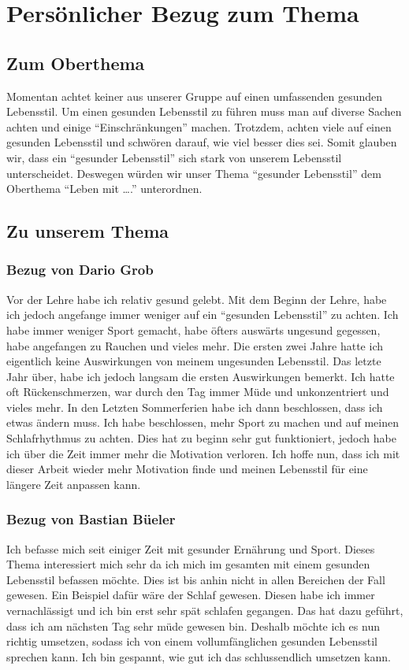 \chapter{Persönlicher Bezug zum Thema}
\section{Zum Oberthema}
Momentan achtet keiner aus unserer Gruppe auf einen umfassenden gesunden Lebensstil.
Um einen gesunden Lebensstil zu führen muss man auf diverse Sachen achten und einige “Einschränkungen” machen. Trotzdem, achten viele auf einen gesunden Lebensstil und schwören darauf, wie viel besser dies sei. 
Somit glauben wir, dass ein “gesunder Lebensstil” sich stark von unserem Lebensstil unterscheidet. Deswegen würden wir unser Thema “gesunder Lebensstil” dem Oberthema “Leben mit ….” unterordnen.
\section{Zu unserem Thema}
\subsection{Bezug von Dario Grob}
Vor der Lehre habe ich relativ gesund gelebt. Mit dem Beginn der Lehre, habe ich jedoch angefange immer weniger auf ein “gesunden Lebensstil” zu achten.
\newline
Ich habe immer weniger Sport gemacht, habe öfters auswärts ungesund gegessen, habe angefangen zu Rauchen und vieles mehr. 
\newline
Die ersten zwei Jahre hatte ich eigentlich keine Auswirkungen von meinem ungesunden Lebensstil. 
\newline
Das letzte Jahr über, habe ich jedoch langsam die ersten Auswirkungen bemerkt. Ich hatte oft Rückenschmerzen, war durch den Tag immer Müde und unkonzentriert und vieles mehr.
\newline
In den Letzten Sommerferien habe ich dann beschlossen, dass ich etwas ändern muss. Ich habe beschlossen, mehr Sport zu machen und auf meinen Schlafrhythmus zu achten. 
\newline
Dies hat zu beginn sehr gut funktioniert, jedoch habe ich über die Zeit immer mehr die Motivation verloren.
\newline
Ich hoffe nun, dass ich mit dieser Arbeit wieder mehr Motivation finde und meinen Lebensstil für eine längere Zeit anpassen kann.
\subsection{Bezug von Bastian Büeler}
Ich befasse mich seit einiger Zeit mit gesunder Ernährung und Sport. Dieses Thema interessiert mich sehr da ich mich im gesamten mit einem gesunden Lebensstil befassen möchte. Dies ist bis anhin nicht in allen Bereichen der Fall gewesen. Ein Beispiel dafür wäre der Schlaf gewesen. Diesen habe ich immer vernachlässigt und ich bin erst sehr spät schlafen gegangen. Das hat dazu geführt, dass ich am nächsten Tag sehr müde gewesen bin. Deshalb möchte ich es nun richtig umsetzen, sodass ich von einem vollumfänglichen gesunden Lebensstil sprechen kann. Ich bin gespannt, wie gut ich das schlussendlich umsetzen kann.

